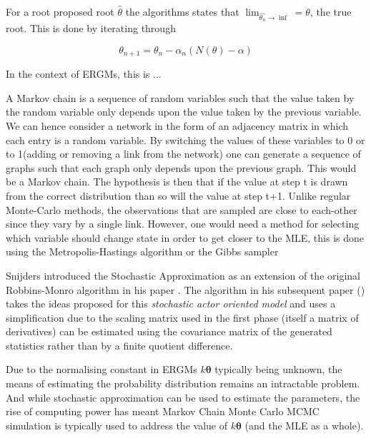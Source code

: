 For a root proposed root $\hat{\theta}$ the \citeauthor{robbinsmonro1951} algorithms states that $\lim_{\hat{\theta_n} \rightarrow \inf} = \theta$, the true root. This is done by iterating through 

\begin{equation}
\label{eqn:rm_update}
\theta_{n+1} = \theta_{n} - \alpha_n(N(\theta) - \alpha)
\end{equation}



In the context of ERGMs, this is ...

A Markov chain is a sequence of random variables such that the value taken by the random variable only depends upon the value taken by the previous variable. We can hence consider a network in the form of an adjacency matrix in which each entry is a random variable. By switching the values of these variables to 0 or to 1(adding or removing a link from the network) one can generate a sequence of graphs such that each graph only depends upon the previous graph. This would be a Markov chain. The hypothesis is then that if the value at step t is drawn from the correct distribution than so will the value at step t+1. Unlike regular Monte-Carlo methods, the observations that are sampled are close to each-other since they vary by a single link. However, one would need a method for selecting which variable should change state in order to get closer to the MLE, this is done using the Metropolis-Hastings algorithm or the Gibbs sampler





Snijders introduced the Stochastic Approximation as an extension of the original Robbins-Monro algorithm in his paper \cite{snijders2001}. The algorithm in his subsequent paper (\cite{snijders2002}) takes the ideas proposed for this \textit{stochastic actor oriented model} and uses a simplification due to the scaling matrix used in the first phase (itself a matrix of derivatives) can be estimated using the covariance matrix of the generated statistics rather than by a finite quotient difference.

Due to the normalising constant in ERGMs $k\boldsymbol{\theta}$ typically being unknown, the means of estimating the probability distribution remains an intractable problem. And while stochastic approximation can be used to estimate the parameters, the rise of computing power has meant Markov Chain Monte Carlo MCMC simulation is typically used to address the value of $k\boldsymbol{\theta}$ (and the MLE as a whole).

